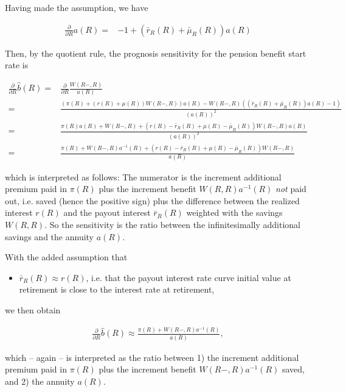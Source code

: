\documentclass{article}
\newcommand{\1}[1]{\mathbbm{1}_{\left\lbrace #1 \right\rbrace}}
\theoremstyle{break}
\theoremstyle{remark}
\numberwithin{equation}{section}
\begin{document}
Having made the assumption, we have

\begin{align*}
	\frac{\partial}{\partial R} a(R) =& - 1 +  \left(\bar{r}_R(R)+\bar{\mu}_R(R)\right) a(R)
\end{align*}

Then, by the quotient rule, the prognosis sensitivity for the pension benefit start rate is

\begin{align*}
	\frac{\partial}{\partial R} \hat{b}(R) =& \frac{\partial}{\partial R} \frac{W(R-,R)}{a(R)} \\
	=& \frac{\left( \pi(R) + \left(r(R) + \mu(R)\right) W(R-,R) \right) a(R) - W(R-,R) \left( \left(\bar{r}_R(R) + \bar{\mu}_R(R)\right) a(R) - 1 \right)}{\left( a(R) \right)^2} \\
	=& \frac{\pi(R) a(R)  + W(R-,R) + \left( r(R) - \bar{r}_R(R) + \mu(R) - \bar{\mu}_R(R) \right) W(R-,R) a(R)}{\left( a(R) \right)^2} \\
	=& \frac{\pi(R)  + W(R-,R) a^{-1}(R) + \left( r(R) - \bar{r}_R(R) + \mu(R) - \bar{\mu}_R(R) \right) W(R-,R)}{ a(R) }
\end{align*}

which is interpreted as follows: The numerator is the increment additional premium paid in $\pi(R)$ plus the increment benefit $W(R,R) a^{-1}(R)$ \textit{not} paid out, i.e. saved (hence the positive sign) plus the difference between the realized interest $r(R)$ and the payout interest $\bar{r}_R(R)$ weighted with the savings $W(R,R)$. So the sensitivity is the ratio between the infinitesimally additional savings and the annuity $a(R)$.

With the added assumption that

\begin{itemize}
	\item $\bar{r}_R (R) \approx r (R)$, i.e. that the payout interest rate curve initial value at retirement is close to the interest rate at retirement,
\end{itemize}

we then obtain

\begin{align*}
	\frac{\partial}{\partial R} \hat{b}(R) \approx \frac{\pi(R) + W(R-,R) a^{-1}(R)}{a(R)},
\end{align*}

which -- again -- is interpreted as the ratio between 1) the increment additional premium paid in $\pi(R)$ plus the increment benefit $W(R-,R) a^{-1}(R)$ saved, and 2) the annuity $a(R)$.
\end{document}
